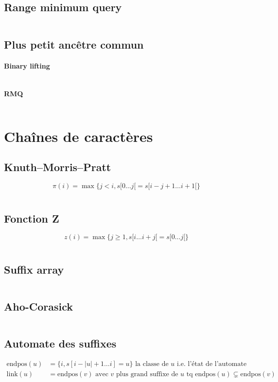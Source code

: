 \documentclass[10pt,twocolumn]{article}
\renewcommand{\geq}{\geqslant}
\begin{document}
\subsection{Range minimum query}
\inputminted[breaklines,tabsize=4]{cpp}{code/rmq.cpp}

\subsection{Plus petit ancêtre commun}
\paragraph{Binary lifting}
\inputminted[breaklines,tabsize=4]{cpp}{code/lca.cpp}
\paragraph{RMQ}
\inputminted[breaklines,tabsize=4]{cpp}{code/rmqlca.cpp}

\section{Chaînes de caractères}

\subsection{Knuth--Morris--Pratt}
$$
    \pi(i) = \max\{j < i, s[0\dots j[ = s[i-j+1 \dots i+1[\}
$$
\inputminted[breaklines,tabsize=4]{cpp}{code/kmp.cpp}

\subsection{Fonction Z}
$$
    z(i) = \max\{j \geq 1, s[i\dots i+j[ = s[0\dots j[\}
$$
\inputminted[breaklines,tabsize=4]{cpp}{code/zfunction.cpp}

\subsection{Suffix array}
\inputminted[breaklines,tabsize=4]{cpp}{code/suffixarray.cpp}

\subsection{Aho-Corasick}
\inputminted[breaklines,tabsize=4]{cpp}{code/aho_corasick.cpp}

\subsection{Automate des suffixes}
\begin{align*}
    \mathrm{endpos}(u) &= \{i, s[i - |u| + 1 \dots i] = u\} \text{ la classe de $u$ i.e. l'état de l'automate} \\
    \mathrm{link}(u) &= \mathrm{endpos}(v) \text{ avec $v$ plus grand suffixe de $u$ tq } \mathrm{endpos}(u) \subsetneq \mathrm{endpos}(v) 
\end{align*}
\inputminted[breaklines,tabsize=4]{cpp}{code/suffixautomaton.cpp}
\end{document}
